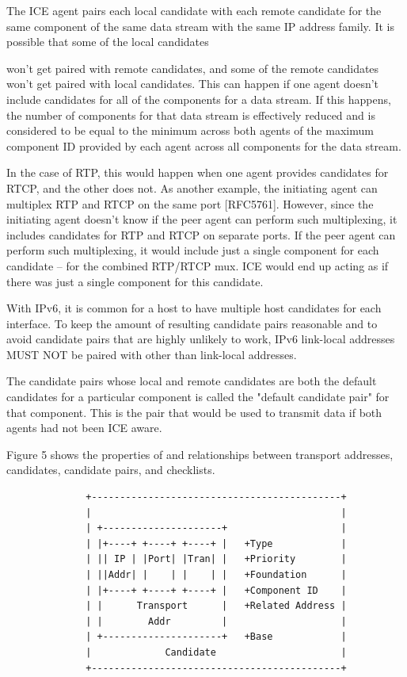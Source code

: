 \documentclass{article}
\begin{document}
The ICE agent pairs each local candidate with each remote candidate for the same component of the same data stream with the same IP address family.  It is possible that some of the local candidates

won't get paired with remote candidates, and some of the remote candidates won't get paired with local candidates.  This can happen if one agent doesn't include candidates for all of the components for a data stream.  If this happens, the number of components for that data stream is effectively reduced and is considered to be equal to the minimum across both agents of the maximum component ID provided by each agent across all components for the data stream.

In the case of RTP, this would happen when one agent provides candidates for RTCP, and the other does not.  As another example, the initiating agent can multiplex RTP and RTCP on the same port [RFC5761].  However, since the initiating agent doesn't know if the peer agent can perform such multiplexing, it includes candidates for RTP and RTCP on separate ports.  If the peer agent can perform such multiplexing, it would include just a single component for each candidate -- for the combined RTP/RTCP mux.  ICE would end up acting as if there was just a single component for this candidate.

With IPv6, it is common for a host to have multiple host candidates for each interface.  To keep the amount of resulting candidate pairs reasonable and to avoid candidate pairs that are highly unlikely to work, IPv6 link-local addresses MUST NOT be paired with other than link-local addresses.

The candidate pairs whose local and remote candidates are both the default candidates for a particular component is called the "default candidate pair" for that component.  This is the pair that would be used to transmit data if both agents had not been ICE aware.

Figure 5 shows the properties of and relationships between transport addresses, candidates, candidate pairs, and checklists.

\begin{verbatim}
              +--------------------------------------------+
              |                                            |
              | +---------------------+                    |
              | |+----+ +----+ +----+ |   +Type            |
              | || IP | |Port| |Tran| |   +Priority        |
              | ||Addr| |    | |    | |   +Foundation      |
              | |+----+ +----+ +----+ |   +Component ID    |
              | |      Transport      |   +Related Address |
              | |        Addr         |                    |
              | +---------------------+   +Base            |
              |             Candidate                      |
              +--------------------------------------------+
\end{verbatim}
\end{document}
